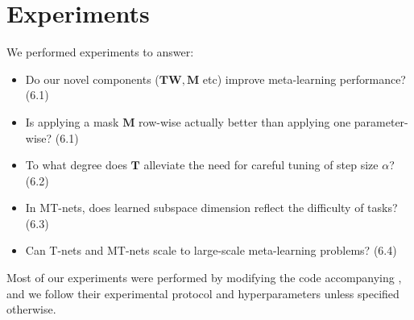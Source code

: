 \documentclass{article}
\newcommand{\W}{\mathbf{W}}
\newcommand{\T}{\mathbf{T}}
\newcommand{\M}{\mathbf{M}}
\newcommand{\mask}{\M}
\begin{document}
\iffalse
The concept of fast weights\cite{fast} is also related to our method.
The idea here is that in addition to ordinary (slow) weights, having fast weights that rapidly activate and decay can result in robust yet adaptive learning.
This paper gives some evidence from physiology which suggests that similar mechanisms are inside the human brain as well.
\fi


\section{Experiments}
We performed experiments to answer:
\begin{itemize}
\setlength\itemsep{0em}
	\item Do our novel components ($\T \W, \mask$ etc) improve meta-learning performance? (6.1)
	\item Is applying a mask $\mask$ row-wise actually better than applying one parameter-wise? (6.1)
	\item To what degree does $\T$ alleviate the need for careful tuning of step size $\alpha$? (6.2)
	\item In MT-nets, does learned subspace dimension reflect the difficulty of tasks? (6.3)
	\item Can T-nets and MT-nets scale to large-scale meta-learning problems? (6.4)
\end{itemize}

Most of our experiments were performed by modifying the code accompanying \cite{FinnC2017icml},
and we follow their experimental protocol and hyperparameters unless specified otherwise.
\end{document}
